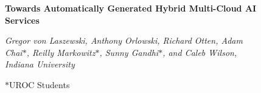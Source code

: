\documentclass[letter,10pt]{article}
\date{}
\begin{document}

\vspace{-3.5cm}


\begin{figure}[!h]
\begin{tcolorbox}[enhanced,
  frame style,
  colback=red!10,
  colframe=red!75!black]

{\Large\bf Towards Automatically Generated Hybrid Multi-Cloud AI Services} 


{\em Gregor von Laszewski,
Anthony Orlowski,
Richard Otten,
Adam Chai$*$,
Reilly Markowitz$*$,
Sunny Gandhi$*$,
and Caleb Wilson, Indiana University

$*$UROC Students \hfill }
\end{tcolorbox}
\end{figure}
\end{document}
